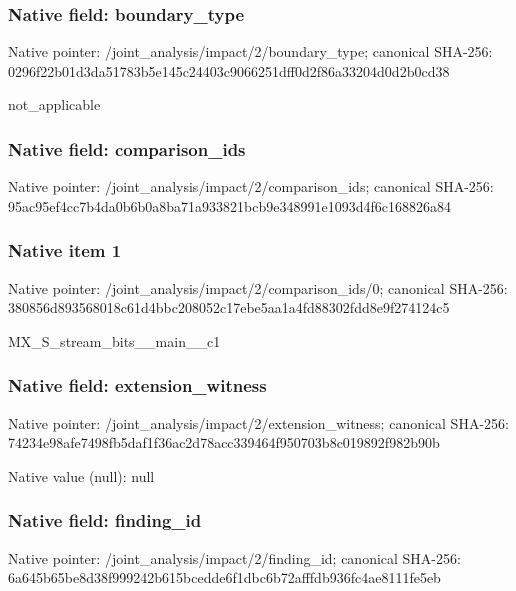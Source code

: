 \documentclass[10pt,a4paper]{article}
\begin{document}
\subsubsection{Native field: boundary\_\allowbreak{}type}
Native pointer: /joint\_\allowbreak{}analysis/impact/2/boundary\_\allowbreak{}type; canonical SHA-256: 0296f22b01d3da51783b5e145c24403c9066251dff0d2f86a33204d0d2b0cd38

\begingroup\raggedright\sloppy not\_\allowbreak{}applicable\par\endgroup

\subsubsection{Native field: comparison\_\allowbreak{}ids}
Native pointer: /joint\_\allowbreak{}analysis/impact/2/comparison\_\allowbreak{}ids; canonical SHA-256: 95ac95ef4cc7b4da0b6b0a8ba71a933821bcb9e348991e1093d4f6c168826a84

\subsubsection{Native item 1}
Native pointer: /joint\_\allowbreak{}analysis/impact/2/comparison\_\allowbreak{}ids/0; canonical SHA-256: 380856d893568018c61d4bbc208052c17ebe5aa1a4fd88302fdd8e9f274124c5

\begingroup\raggedright\sloppy MX\_\allowbreak{}S\_\allowbreak{}stream\_\allowbreak{}bits\_\allowbreak{}\_\allowbreak{}main\_\allowbreak{}\_\allowbreak{}c1\par\endgroup

\subsubsection{Native field: extension\_\allowbreak{}witness}
Native pointer: /joint\_\allowbreak{}analysis/impact/2/extension\_\allowbreak{}witness; canonical SHA-256: 74234e98afe7498fb5daf1f36ac2d78acc339464f950703b8c019892f982b90b

Native value (null): null

\subsubsection{Native field: finding\_\allowbreak{}id}
Native pointer: /joint\_\allowbreak{}analysis/impact/2/finding\_\allowbreak{}id; canonical SHA-256: 6a645b65be8d38f999242b615bcedde6f1dbc6b72afffdb936fc4ae8111fe5eb
\end{document}
